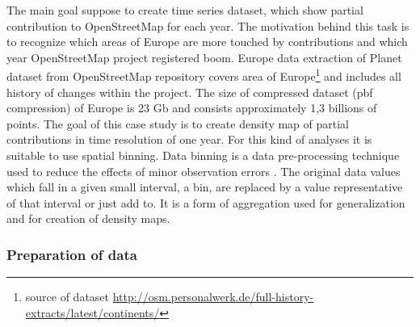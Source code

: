\documentclass[a4paper,12pt,oneside]{report}
\begin{document}
	The main goal suppose to create time series dataset, which show partial contribution to OpenStreetMap for each year. The motivation behind this task is to recognize which areas of
	Europe are more touched by contributions and which year OpenStreetMap
	project registered boom. Europe data extraction of Planet dataset from
        OpenStreetMap repository covers area of Europe\footnote{source of dataset
	\url{http://osm.personalwerk.de/full-history-extracts/latest/continents/}} 
	and includes all history of changes  within the project. The size of compressed
	dataset (pbf compression) of 
	Europe is 23 Gb and consists approximately 1,3 billions of points.
	The goal of this case study is to create density map of partial contributions in time
	resolution of one year. For this kind of analyses it is suitable to use spatial
	binning. Data binning is a data pre-processing technique used to reduce the
	effects of minor observation errors \cite{bining}. The original data values which
	fall in a given small interval, a bin, are replaced by a value representative of
	that interval or just add to. It is a form of aggregation used for
	generalization and for creation of density maps.
	
	
\subsubsection{Preparation of data}
\end{document}
